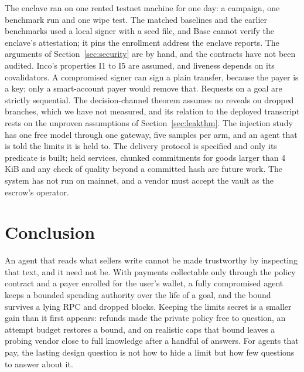 The enclave ran on one rented testnet machine for one day: a campaign, one benchmark run and one wipe test. The matched baselines and the earlier
benchmarks used a local signer with a seed file, and Base cannot verify the enclave's attestation; it pins the enrollment address the enclave reports. The arguments of Section~\ref{sec:security} are by hand, and the contracts have not been audited. Inco's properties I1 to
I5 are assumed, and liveness depends on its covalidators. A compromised signer can sign a plain transfer, because the payer is a key; only a smart-account payer
would remove that. Requests on a goal are strictly sequential. The decision-channel theorem assumes no reveals on dropped branches, which we have not measured,
and its relation to the deployed transcript rests on the unproven assumptions of Section~\ref{sec:leakthm}. The injection study has one free model through one
gateway, five samples per arm, and an agent that is told the limits it is held to. The delivery protocol is specified and only its predicate is built; held services, chunked commitments for goods larger
than 4 KiB and any check of quality beyond a committed hash are future work. The system has not run on mainnet, and a vendor must accept the vault as the
escrow's operator.

\section{Conclusion}

An agent that reads what sellers write cannot be made trustworthy by inspecting that text, and it need not be. With payments collectable only through the
policy contract and a payer enrolled for the user's wallet, a fully compromised agent keeps a bounded spending authority over the life of a goal, and the
bound survives a lying RPC and dropped blocks. Keeping the limits secret is a smaller gain than it first appears: refunds made the private policy free to
question, an attempt budget restores a bound, and on realistic caps that bound leaves a probing vendor close to full knowledge after a handful of answers.
For agents that pay, the lasting design question is not how to hide a limit but how few questions to answer about it.

